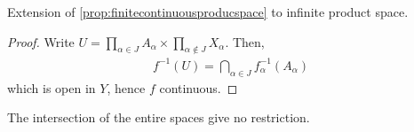 \begin{remark}
    Extension of \cref{prop:finitecontinuousproducspace} to infinite product space.
\end{remark}

\begin{proof}
    Write $U = \prod_{\alpha \in J}A_\alpha \times \prod_{\alpha \notin J}X_\alpha$. Then, \begin{align*}
        f^{-1}(U) = \bigcap_{\alpha \in J} f_\alpha^{-1}(A_\alpha)
    \end{align*}
    which is open in $Y$, hence $f$ continuous.
\end{proof}

\begin{remark}
    The intersection of the entire spaces give no restriction.
\end{remark}
